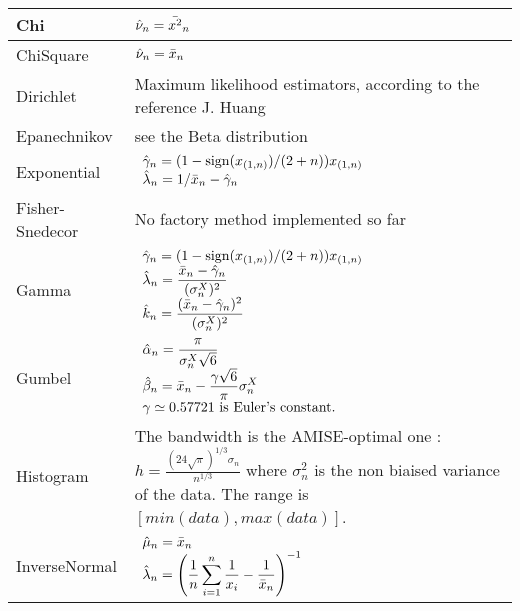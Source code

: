 {  \begin{tabular}{|l|p{12cm}|}
    \hline
    Chi & $\displaystyle\Hat{\nu}_n=\bar{x^2}_n$\\
    \hline
    ChiSquare & $\displaystyle\Hat{\nu}_n=\bar{x}_n$\\
    \hline
    Dirichlet &  Maximum likelihood estimators, according to the reference J. Huang\\
    \hline
    Epanechnikov  & see the Beta distribution\\
    \hline
    Exponential & $\begin{array}{l}
      \displaystyle\Hat{\gamma}_n = (1-\mathrm{sign}(x_{(1,n)})/(2+n))x_{(1,n)}\\
      \displaystyle\Hat{\lambda}_n= 1/\bar{x}_n-\Hat{\gamma}_n
    \end{array}$\\
    \hline
    Fisher-Snedecor   & No factory method implemented so far\\
    \hline
    Gamma & $\begin{array}{l}
      \displaystyle\Hat{\gamma}_n = (1-\mathrm{sign}(x_{(1,n)})/(2+n))x_{(1,n)}\\
      \displaystyle\Hat{\lambda}_n= \frac{\bar{x}_n-\Hat{\gamma}_n}{(\sigma_n^X)^2}\\
      \displaystyle\Hat{k}_n= \frac{(\bar{x}_n-\Hat{\gamma}_n)^2}{(\sigma_n^X)^2}
    \end{array}$\\
    \hline
    Gumbel &  $\begin{array}{l}
      \displaystyle\Hat{\alpha}_n=\frac{\pi}{\sigma_n^X\sqrt{6}}\\
      \displaystyle\Hat{\beta}_n=\bar{x}_n-\frac{\gamma\sqrt{6}}{\pi}\sigma_n^X\\
      \gamma\simeq 0.57721\mbox{ is Euler's constant.}
    \end{array}$\\
    \hline
    Histogram & The bandwidth is the AMISE-optimal one : $h = \displaystyle \frac{(24\sqrt{\pi})^{1/3} \sigma_n}{n^{1/3}}$ where $\sigma_n^2$ is the non biaised variance of the data. The range is $[min(data), max(data)]$.\\
    \hline
     InverseNormal   & $\begin{array}{l}
      \displaystyle\Hat{\mu}_n =  \bar{x}_n\\
      \displaystyle\Hat{\lambda}_n = \left(  \frac{1}{n} \sum_{i=1}^n \frac{1}{x_i} - \frac{1}{\bar{x}_n} \right)^{-1}
    \end{array}$\\

\end{tabular}}
